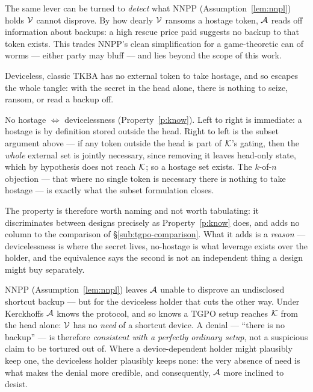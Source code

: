 \begin{remark}\label{rem:hostage-probe}
The same lever can be turned to \emph{detect} what NNPP (Assumption~\ref{lem:nnpl})
holds $\mathcal{V}$ cannot disprove. By how dearly $\mathcal{V}$ ransoms a hostage token,
$\mathcal{A}$ reads off information about backups: a high rescue price paid suggests no
backup to that token exists. This trades NNPP's clean simplification for a
game-theoretic can of worms --- either party may bluff --- and lies beyond the scope
of this work.
\end{remark}

\begin{remark}\label{rem:hostage-tkba}
Deviceless, classic TKBA has no external token to take hostage, and so escapes the
whole tangle: with the secret in the head alone, there is nothing to seize, ransom,
or read a backup off.
\end{remark}

\begin{corollary}\label{cor:hostage-equiv}
No hostage $\Leftrightarrow$ devicelessness (Property~\ref{p:know}). Left to right is
immediate: a hostage is by definition stored outside the head. Right to left is the
subset argument above --- if any token outside the head is part of $\mathcal{K}$'s gating,
then the \emph{whole} external set is jointly necessary, since removing it leaves
head-only state, which by hypothesis does not reach $\mathcal{K}$; so a hostage set exists.
The $k$-of-$n$ objection --- that where no single token is necessary there is nothing
to take hostage --- is exactly what the subset formulation closes.

The property is therefore worth naming and not worth tabulating: it discriminates
between designs precisely as Property~\ref{p:know} does, and adds no column to the
comparison of \S\ref{sub:tgpo-comparison}. What it adds is a \emph{reason} ---
devicelessness is where the secret lives, no-hostage is what leverage exists over the
holder, and the equivalence says the second is not an independent thing a design
might buy separately.
\end{corollary}

\begin{remark}\label{rem:plausible-denial}
NNPP (Assumption~\ref{lem:nnpl}) leaves $\mathcal{A}$ unable to disprove an undisclosed
shortcut backup --- but for the deviceless holder that cuts the other way. Under
Kerckhoffs $\mathcal{A}$ knows the protocol, and so knows a TGPO setup reaches $\mathcal{K}$ from
the head alone: $\mathcal{V}$ has no \emph{need} of a shortcut device. A denial ---
``there is no backup'' --- is therefore \emph{consistent with a perfectly ordinary
setup}, not a suspicious claim to be tortured out of. Where a device-dependent holder
might plausibly keep one, the deviceless holder plausibly keeps none: the very
absence of need is what makes the denial more credible, and consequently, $\mathcal{A}$ 
more inclined to desist.
\end{remark}


